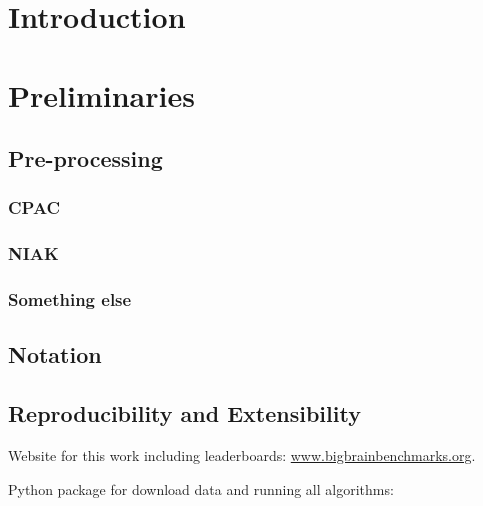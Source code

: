 %
%
%
%
%
%
%
%
%
{\vspace{-100pt}
\maketitle
}\setcounter{tocdepth}{2}
\tableofcontents

\begin{abstract}
\end{abstract}

\newpage
\section{Introduction}

\section{Preliminaries} \label{sec:methods}

\subsection{Pre-processing}


\subsubsection{CPAC}


\subsubsection{NIAK}


\subsubsection{Something else}


\subsection{Notation}



\subsection{Reproducibility and Extensibility}


Website for this work including leaderboards: \url{www.bigbrainbenchmarks.org}.

Python package for download data and running all algorithms: 

